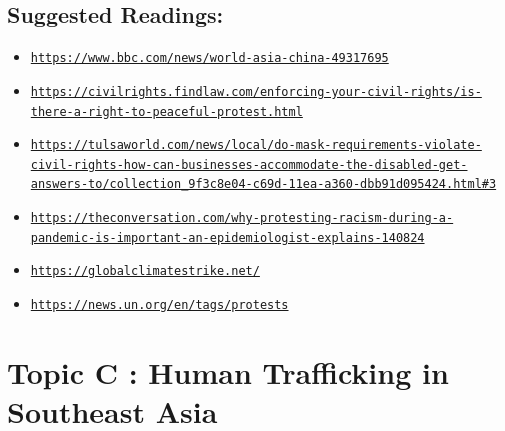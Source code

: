 \documentclass[10pt, letterpaper]{article}
\begin{document}
\subsection{Suggested Readings:}

\begin{itemize}
\item
  
  \texttt{\href{https://www.bbc.com/news/world-asia-china-49317695}{{https://www.bbc.com/news/world-asia-china-49317695}}}
  
\item
  
  \texttt{\href{https://civilrights.findlaw.com/enforcing-your-civil-rights/is-there-a-right-to-peaceful-protest.html}{{\nolinkurl{https://civilrights.findlaw.com/enforcing-your-civil-rights/is-there-a-right-to-peaceful-protest.html}}}}
  
\item
  
  \texttt{\href{https://tulsaworld.com/news/local/do-mask-requirements-violate-civil-rights-how-can-businesses-accommodate-the-disabled-get-answers-to/collection_9f3c8e04-c69d-11ea-a360-dbb91d095424.html\#3}{{\nolinkurl{https://tulsaworld.com/news/local/do-mask-requirements-violate-civil-rights-how-can-businesses-accommodate-the-disabled-get-answers-to/collection\_9f3c8e04-c69d-11ea-a360-dbb91d095424.html\#3}}}}
  
\item
  
  \texttt{\href{https://theconversation.com/why-protesting-racism-during-a-pandemic-is-important-an-epidemiologist-explains-140824}{{\nolinkurl{https://theconversation.com/why-protesting-racism-during-a-pandemic-is-important-an-epidemiologist-explains-140824}}}}
  
\item
  
  \texttt{\href{https://globalclimatestrike.net/}{{https://globalclimatestrike.net/}}
  }
\item
  
  \texttt{\href{https://news.un.org/en/tags/protests}{{https://news.un.org/en/tags/protests}}}
  
\end{itemize}

\newpage
\section{{Topic C : Human Trafficking in Southeast Asia}}
\end{document}
